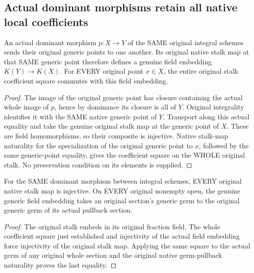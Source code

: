 \subsection{Actual dominant morphisms retain all native local coefficients}

\begin{lemma}
\label{lem:actual-dominant-function-field-map}
\leanok
An actual dominant morphism $p:X\to Y$ of the SAME original integral schemes
sends their original generic points to one another. Its original native stalk
map at that SAME generic point therefore defines a genuine field embedding
$K(Y)\to K(X)$. For EVERY original point $x\in X$, the entire original stalk
coefficient square commutes with this field embedding.
\end{lemma}
\begin{proof}
The image of the original generic point has closure containing the actual
whole image of $p$, hence by dominance its closure is all of $Y$. Original
integrality identifies it with the SAME native generic point of $Y$.
Transport along this actual equality and take the genuine original stalk map
at the generic point of $X$. These are field homomorphisms, so their composite
is injective. Native stalk-map naturality for the specialization of the
original generic point to $x$, followed by the same generic-point equality,
gives the coefficient square on the WHOLE original stalk. No preservation
condition on its elements is supplied.
\end{proof}

\begin{lemma}
\label{lem:actual-dominant-stalk-injectivity}
\leanok
For the SAME dominant morphism between integral schemes, EVERY original
native stalk map is injective. On EVERY original nonempty open, the genuine
generic field embedding takes an original section's generic germ to the
original generic germ of its actual pullback section.
\end{lemma}
\begin{proof}
The original stalk embeds in its original fraction field. The whole
coefficient square just established and injectivity of the actual field
embedding force injectivity of the original stalk map. Applying the same
square to the actual germ of any original whole section and the original
native germ-pullback naturality proves the last equality.
\end{proof}
